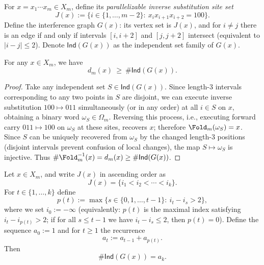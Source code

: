 \begin{definition}\label{def:pom-carry-interference-graph}
For $x=x_1\cdots x_m\in X_m$, define its \emph{parallelizable inverse substitution site set}
\[
J(x):=\{i\in\{1,\dots,m-2\}:\ x_ix_{i+1}x_{i+2}=100\}.
\]
Define the interference graph $G(x)$: its vertex set is $J(x)$, and for $i\neq j$ there is an edge if and only if intervals $[i,i+2]$ and $[j,j+2]$ intersect (equivalent to $|i-j|\le 2$). Denote $\mathsf{Ind}(G(x))$ as the independent set family of $G(x)$.
\end{definition}

\begin{lemma}\label{lem:pom-fiber-lower-bound-independent-sets}
For any $x\in X_m$, we have
\[
d_m(x)\ \ge\ \#\mathsf{Ind}(G(x)).
\]
\end{lemma}

\begin{proof}
Take any independent set $S\in\mathsf{Ind}(G(x))$. Since length-$3$ intervals corresponding to any two points in $S$ are disjoint, we can execute inverse substitution $100\mapsto 011$ simultaneously (or in any order) at all $i\in S$ on $x$, obtaining a binary word $\omega_S\in\Omega_m$.
Reversing this process, i.e., executing forward carry $011\mapsto 100$ on $\omega_S$ at these sites, recovers $x$; therefore $\Fold_m(\omega_S)=x$.
Since $S$ can be uniquely recovered from $\omega_S$ by the changed length-$3$ positions (disjoint intervals prevent confusion of local changes), the map $S\mapsto \omega_S$ is injective.
Thus $\#\Fold_m^{-1}(x)=d_m(x)\ge \#\mathsf{Ind}(G(x))$.
\end{proof}

\begin{lemma}\label{lem:pom-independence-dp-radius2}
Let $x\in X_m$, and write $J(x)$ in ascending order as
\[
J(x)=\{i_1<i_2<\cdots<i_k\}.
\]
For $t\in\{1,\dots,k\}$ define
\[
p(t):=\max\{s\in\{0,1,\dots,t-1\}:\ i_t-i_s>2\},
\]
where we set $i_0:=-\infty$ (equivalently: $p(t)$ is the maximal index satisfying $i_t-i_{p(t)}>2$; if for all $s\le t-1$ we have $i_t-i_s\le 2$, then $p(t)=0$).
Define the sequence $a_0:=1$ and for $t\ge 1$ the recurrence
\[
a_t:=a_{t-1}+a_{p(t)}.
\]
Then
\[
\#\mathsf{Ind}(G(x))=a_k.
\]
\end{lemma}

